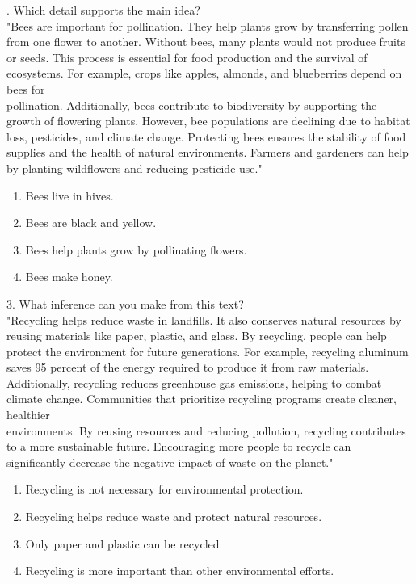 \documentclass[12pt]{article}
\begin{document}
\vspace{1cm}
. Which detail supports the main idea?\\
"Bees are important for pollination. They help plants grow by transferring pollen from one flower to another. Without bees, many plants would not produce fruits or seeds. This process is essential for food production and the survival of ecosystems. For example, crops like apples, almonds, and blueberries depend on bees for\\ pollination. Additionally, bees contribute to biodiversity by supporting the growth of flowering plants. However, bee populations are declining due to habitat loss, pesticides, and climate change. Protecting bees ensures the stability of food supplies and the health of natural environments. Farmers and gardeners can help by planting wildflowers and reducing pesticide use."\\
\begin{enumerate}[label=\Alph*.]
    \item Bees live in hives.  
    \item Bees are black and yellow.  
    \item Bees help plants grow by pollinating flowers.  
    \item Bees make honey.  
\end{enumerate}

\vspace{1cm}

3. What inference can you make from this text?\\
"Recycling helps reduce waste in landfills. It also conserves natural resources by reusing materials like paper, plastic, and glass. By recycling, people can help protect the environment for future generations. For example, recycling aluminum saves 95 percent of the energy required to produce it from raw materials. Additionally, recycling reduces greenhouse gas emissions, helping to combat climate change. Communities that prioritize recycling programs create cleaner, healthier\\ environments. By reusing resources and reducing pollution, recycling contributes to a more sustainable future. Encouraging more people to recycle can significantly decrease the negative impact of waste on the planet."\\
\begin{enumerate}[label=\Alph*.]
    \item Recycling is not necessary for environmental protection.  
    \item Recycling helps reduce waste and protect natural resources.  
    \item Only paper and plastic can be recycled.  
    \item Recycling is more important than other environmental efforts.  
\end{enumerate}
\end{document}
